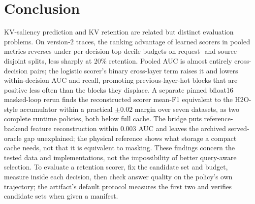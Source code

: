 \section{Conclusion}
KV-saliency prediction and KV retention are related but distinct evaluation
problems. On version-2 traces, the ranking advantage of learned scorers in pooled
metrics reverses under per-decision top-decile budgets on request- and source-disjoint
splits, less sharply at 20\% retention. Pooled AUC is almost entirely cross-decision
pairs; the logistic scorer's binary cross-layer term raises it and lowers
within-decision AUC and recall, promoting previous-layer-hot blocks that are positive
less often than the blocks they displace. A separate pinned bfloat16 masked-loop rerun
finds the reconstructed scorer mean-F1 equivalent to the H2O-style accumulator within a
practical $\pm0.02$ margin over seven datasets, as two complete runtime policies, both
below full cache. The bridge puts reference-backend feature reconstruction within 0.003
AUC and leaves the archived served-oracle gap unexplained; the physical reference shows
what storage a compact cache needs, not that it is equivalent to masking. These
findings concern the tested data and implementations, not the impossibility of better
query-aware selection. To evaluate a retention scorer, fix the candidate set and
budget, measure inside each decision, then check answer quality on the policy's own
trajectory; the artifact's default protocol measures the first two and verifies
candidate sets when given a manifest.
